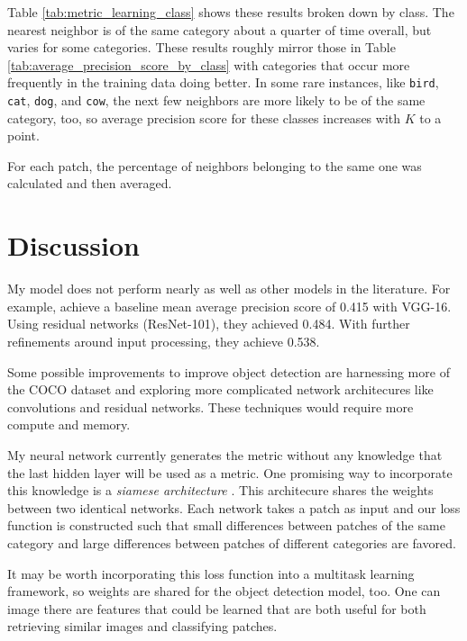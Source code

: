 \documentclass[letterpaper]{article}
\begin{document}
Table \ref{tab:metric_learning_class} shows these results broken down by
class. The nearest neighbor is of the same category about a quarter of time
overall, but varies for some categories. These results roughly mirror those in
Table \ref{tab:average_precision_score_by_class} with categories that occur more
frequently in the training data doing better. In some rare instances, like
\texttt{bird}, \texttt{cat}, \texttt{dog}, and \texttt{cow}, the next few
neighbors are more likely to be of the same category, too, so average precision
score for these classes increases with $K$ to a point.

\begin{table}
  \centering
  
  \caption{For each patch, the percentage of neighbors belonging to the
    same one was calculated and then averaged.}
  \label{tab:metric_learning_class}
\end{table}

\section{Discussion}

My model does not perform nearly as well as other models in the literature. For
example, \cite{benchmark} achieve a baseline mean average precision score of
0.415 with VGG-16. Using residual networks (ResNet-101), they achieved
0.484. With further refinements around input processing, they achieve 0.538.

Some possible improvements to improve object detection are harnessing more of
the COCO dataset and exploring more complicated network architecures like
convolutions and residual networks. These techniques would require more compute
and memory.

My neural network currently generates the metric without any knowledge that the
last hidden layer will be used as a metric. One promising way to incorporate
this knowledge is a \emph{siamese architecture} \citep{siamese}. This
architecure shares the weights between two identical networks. Each network
takes a patch as input and our loss function is constructed such that small
differences between patches of the same category and large differences between
patches of different categories are favored.

It may be worth incorporating this loss function into a multitask learning
framework, so weights are shared for the object detection model, too. One can
image there are features that could be learned that are both useful for both
retrieving similar images and classifying patches.



\end{document}
